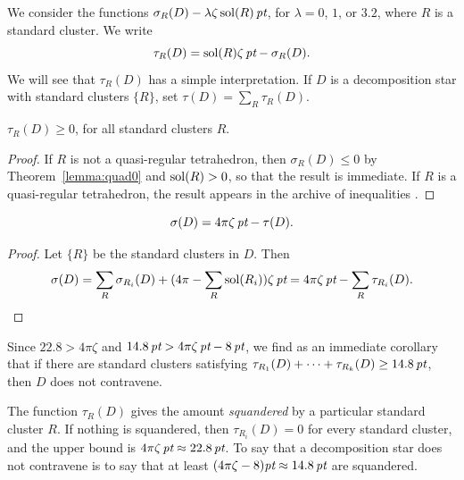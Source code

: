 

We consider the functions
    $\sigma_R(D)-\lambda\zeta\operatorname{sol}(R)\,\hbox{\it pt}$,
for $\lambda=0$, $1$, or $3.2$, where $R$ is a standard cluster.
We write
    $$
    \tau_R(D) = \operatorname{sol}(R)\zeta\,\hbox{\it pt} -
    \sigma_R(D).
    $$
We will see that $\tau_R(D)$ has a simple interpretation.  If $D$
is a decomposition star with standard clusters $\{R\}$, set
$\tau(D) = \sum_{R}\tau_R(D)$.
\smallskip

\begin{lemma}\label{lemma:roger0}
    $\tau_R(D)\ge 0$, for all standard clusters $R$.
\end{lemma}

\begin{proof}
If $R$ is not a quasi-regular tetrahedron, then $\sigma_R(D)\le0$
by Theorem~\ref{lemma:quad0} and $\operatorname{sol}(R)> 0$, so that the result
is immediate. If $R$ is a quasi-regular tetrahedron, the result
appears in the archive of inequalities .
\end{proof}

\begin{lemma}\label{lemma:sigma-tau}
    $$\sigma(D) = {4\pi \zeta\,\hbox{\it pt}} - \tau(D).$$
\end{lemma}

\begin{proof} Let $\{R\}$ be the standard clusters in $D$. Then
    $$
    \sigma(D) = \sum_R\sigma_{R_i}(D) +
        (4\pi-\sum_R\operatorname{sol}(R_i))\zeta\,\hbox{\it pt} = 4\pi \zeta\,\hbox{\it pt} - \sum_R\tau_{R_i}(D).
    $$
\end{proof}

Since $22.8 > 4\pi \zeta$ and $14.8\,\hbox{\it pt} > 4\pi \zeta \, \hbox{\it pt} - 8 \,
\hbox{\it pt}$, we find as an immediate corollary that if there are standard
clusters satisfying $\tau_{R_1}(D)
+\cdots+\tau_{R_k}(D)\ge14.8\,\hbox{\it pt}$, then $D$ does not contravene.

The function $\tau_R(D)$ gives the amount {\it squandered\/} by a
particular standard cluster $R$.  If nothing is squandered, then
$\tau_{R_i}(D)=0$ for every standard cluster, and the upper bound
is
    $4\pi\zeta\,\hbox{\it pt}\approx 22.8\,\hbox{\it pt}$.
To say that a decomposition star does not contravene is to say
that at least $(4\pi \zeta-8)\hbox{\it pt}\approx 14.8\,\hbox{\it pt}$ are squandered.

